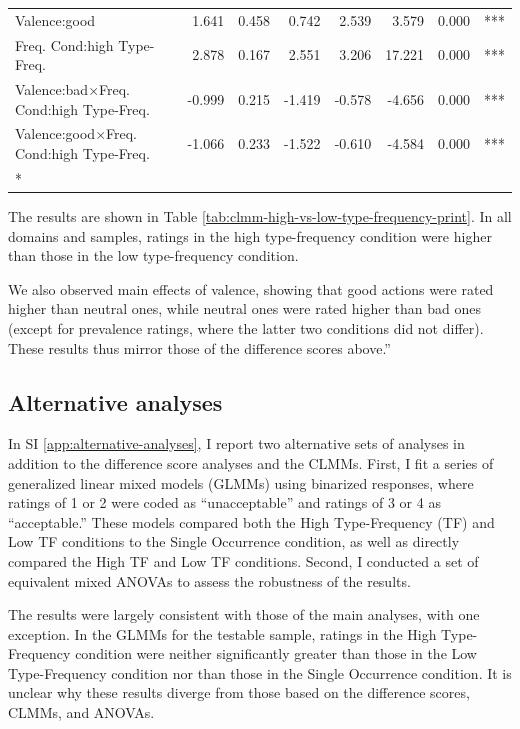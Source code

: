 \documentclass[
]{article}
\begin{document}
\begin{longtable}[t]{lrrrrrrl}
\hspace{1em}Valence:good & 1.641 & 0.458 & 0.742 & 2.539 & 3.579 & 0.000 & ***\\
Freq.
Cond:high
\hspace{1em}Type-Freq. & 2.878 & 0.167 & 2.551 & 3.206 & 17.221 & 0.000 & ***\\
Valence:bad$\times$Freq.
Cond:high
\hspace{1em}Type-Freq. & -0.999 & 0.215 & -1.419 & -0.578 & -4.656 & 0.000 & ***\\
Valence:good$\times$Freq.
Cond:high
\hspace{1em}Type-Freq. & -1.066 & 0.233 & -1.522 & -0.610 & -4.584 & 0.000 & ***\\*
\end{longtable}

The results are shown in Table \ref{tab:clmm-high-vs-low-type-frequency-print}. In all domains and samples, ratings in the high type-frequency condition were higher than those in the low type-frequency condition.

We also observed main effects of valence, showing that good actions were rated higher than neutral ones, while neutral ones were rated higher than bad ones (except for prevalence ratings, where the latter two conditions did not differ).
These results thus mirror those of the difference scores above.''

\clearpage

\subsection{Alternative analyses}\label{alternative-analyses}

In SI \ref{app:alternative-analyses}, I report two alternative sets of analyses in addition to the difference score analyses and the CLMMs. First, I fit a series of generalized linear mixed models (GLMMs) using binarized responses, where ratings of 1 or 2 were coded as ``unacceptable'' and ratings of 3 or 4 as ``acceptable.'' These models compared both the High Type-Frequency (TF) and Low TF conditions to the Single Occurrence condition, as well as directly compared the High TF and Low TF conditions. Second, I conducted a set of equivalent mixed ANOVAs to assess the robustness of the results.

The results were largely consistent with those of the main analyses, with one exception. In the GLMMs for the testable sample, ratings in the High Type-Frequency condition were neither significantly greater than those in the Low Type-Frequency condition nor than those in the Single Occurrence condition. It is unclear why these results diverge from those based on the difference scores, CLMMs, and ANOVAs.
\end{document}
